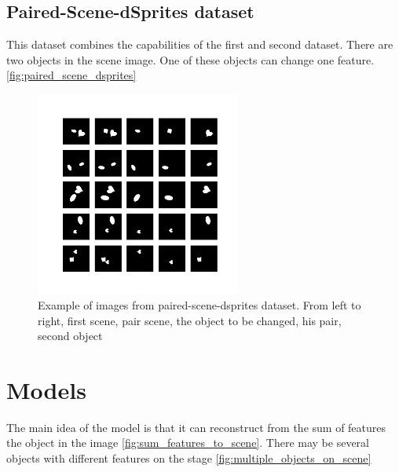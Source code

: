\documentclass{article}
\begin{document}
    \subsection{Paired-Scene-dSprites dataset}
    This dataset combines the capabilities of the first and second dataset.
    There are two objects in the scene image.
    One of these objects can change one feature. \autoref{fig:paired_scene_dsprites}

    \begin{figure}[ht]
        \centering
        \includegraphics[width=0.6\textwidth]{img/datasets/paired-scenes-dsprites}
        \caption{Example of images from paired-scene-dsprites dataset. From left to right,
            first scene, pair scene, the object to be changed, his pair, second object}
        \label{fig:paired_scene_dsprites}
    \end{figure}


    \section{Models}

    The main idea of the model is that it can reconstruct from the sum
    of features the object in the image \autoref{fig:sum_features_to_scene}.
    There may be several objects with different features on the stage \autoref{fig:multiple_objects_on_scene}
\end{document}
